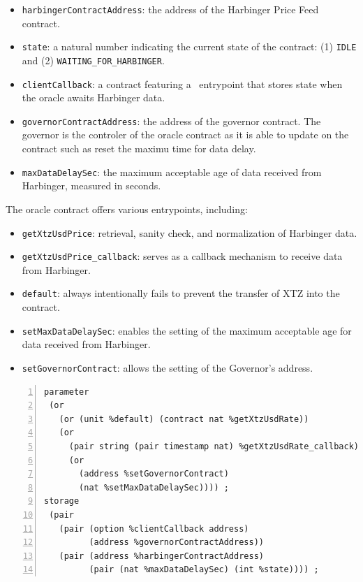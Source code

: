 \documentclass[a4paper,USenglish,cleveref, autoref, thm-restate]{lipics-v2021}
\begin{document}
\begin{itemize}
\item \lstinline/harbingerContractAddress/: the address of the Harbinger Price Feed contract.
 \item    \lstinline/state/: a natural number indicating the current state of the contract: (1) \lstinline/IDLE/ and (2) \lstinline/WAITING_FOR_HARBINGER/.
 \item    \lstinline/clientCallback/: a contract featuring a \TNAT\ entrypoint that stores state when the oracle awaits Harbinger data.
 \item    \lstinline/governorContractAddress/: the address of the governor contract. The governor is the controler of the oracle contract as it is able to update on the contract such as reset the maximu time for data delay.  
 \item    \lstinline/maxDataDelaySec/: the maximum acceptable age of data received from Harbinger, measured in seconds.
\end{itemize}
The oracle contract offers various entrypoints, including:
\begin{itemize}
\item    \lstinline/getXtzUsdPrice/: retrieval, sanity check, and normalization of Harbinger data.
\item    \lstinline/getXtzUsdPrice_callback/: serves as a callback mechanism to receive data from Harbinger.
\item    \lstinline/default/: always intentionally fails to prevent the transfer of XTZ into the contract.
\item    \lstinline/setMaxDataDelaySec/: enables the setting of the maximum acceptable age for data received from Harbinger.
\item    \lstinline/setGovernorContract/: allows the setting of the Governor's address.
\end{itemize}

\begin{lstlisting}[float,captionpos=b,caption={Kolibri oracle contract},label={lst:kolibri-oracle-contract},numbers=left]
parameter
 (or
   (or (unit %default) (contract nat %getXtzUsdRate))
   (or
     (pair string (pair timestamp nat) %getXtzUsdRate_callback)
     (or
       (address %setGovernorContract) 
       (nat %setMaxDataDelaySec)))) ;
storage
 (pair
   (pair (option %clientCallback address) 
         (address %governorContractAddress))
   (pair (address %harbingerContractAddress) 
         (pair (nat %maxDataDelaySec) (int %state)))) ;
\end{lstlisting}
\end{document}
